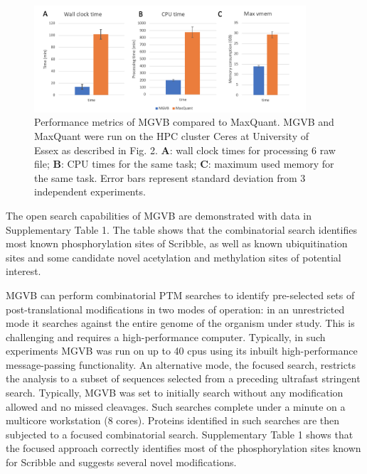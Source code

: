 \documentclass[default]{sn-jnl}
\theoremstyle{thmstyleone}%
\theoremstyle{thmstyletwo}%
\theoremstyle{thmstylethree}%
\begin{document}
\begin{figure}[h]
\centering
\includegraphics[width=0.9\textwidth]{mgvb_fig3.png}
\caption{Performance metrics of MGVB compared to MaxQuant. MGVB and MaxQuant were run on the HPC cluster Ceres at University of Essex as described in Fig. 2. \textbf{A}: wall clock times for processing 6 raw file;  \textbf{B}: CPU times for the same task;  \textbf{C}: maximum used memory for the same task. Error bars represent standard deviation from 3 independent experiments.}\label{fig3}
\end{figure}

The open search capabilities of MGVB are demonstrated with data in Supplementary Table 1. The table shows that the combinatorial search identifies most known phosphorylation sites of Scribble, as well as known ubiquitination sites and some candidate novel acetylation and methylation sites of potential interest. 

MGVB can perform combinatorial PTM searches to identify pre-selected sets of post-translational modifications in two modes of operation: in an unrestricted mode it searches against the entire genome of the organism under study. This is challenging and requires a high-performance computer. Typically, in such experiments MGVB was run on up to 40 cpus using its inbuilt high-performance message-passing functionality. An alternative mode, the focused search, restricts the analysis to a subset of sequences selected from a preceding ultrafast stringent search. Typically, MGVB was set to initially search without any modification allowed and no missed cleavages. Such searches complete under a minute on a multicore workstation (8 cores). Proteins identified in such searches are then subjected to a focused combinatorial search. Supplementary Table 1 shows that the focused approach correctly identifies most of the phosphorylation sites known for Scribble and suggests several novel modifications. 
\end{document}

